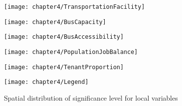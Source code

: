 \begin{figure}[htbp]
	\begin{minipage}{0.48\linewidth}
		\centering
		\texttt{[image: chapter4/TransportationFacility]} %
	\end{minipage}
	\hfill %
	\begin{minipage}{0.48\linewidth}
		\centering
		\texttt{[image: chapter4/BusCapacity]}
	\end{minipage}
	
	\vfill %
	
	\begin{minipage}{0.48\linewidth}
		\centering
		\texttt{[image: chapter4/BusAccessibility]}
	\end{minipage}
	\hfill
	\begin{minipage}{0.48\linewidth}
		\centering
		\texttt{[image: chapter4/PopulationJobBalance]}
	\end{minipage}
	
	\vfill
	
	\begin{minipage}{0.48\linewidth}
		\centering
		\texttt{[image: chapter4/TenantProportion]}
	\end{minipage}
	\hfill
	\begin{minipage}[c]{0.48\linewidth}
		\centering
		\texttt{[image: chapter4/Legend]}\\
	\end{minipage}
	
	\caption{Spatial distribution of significance level for local variables}
	\label{fig:chp4:SignificanceDistribution}
\end{figure}

%
